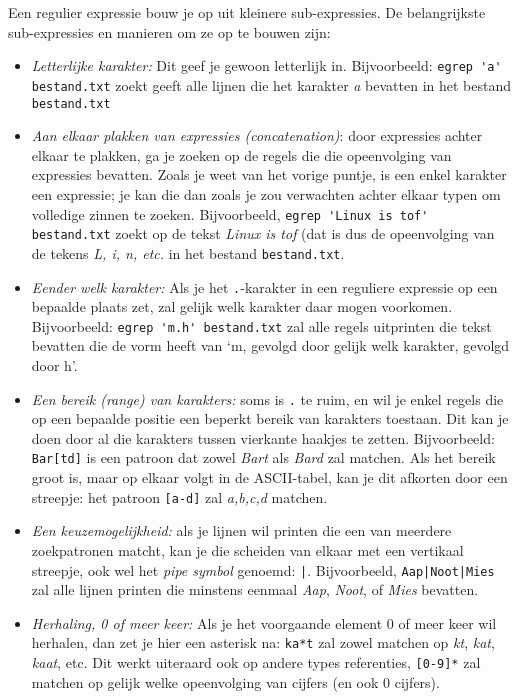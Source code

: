 \documentclass[a4paper,twoside,openany]{memoir}
\begin{document}
Een regulier expressie bouw je op uit kleinere sub-expressies. De belangrijkste sub-expressies en manieren om ze op te bouwen zijn:

\begin{itemize}
\item \emph{Letterlijke karakter:} Dit geef je gewoon letterlijk in.  Bijvoorbeeld: \verb!egrep 'a' bestand.txt! zoekt geeft alle lijnen die het karakter \emph{a} bevatten in het bestand \verb!bestand.txt!
\item \emph{Aan elkaar plakken van expressies (concatenation)}: door expressies achter elkaar te plakken, ga je zoeken op de regels die die opeenvolging van expressies bevatten. Zoals je weet van het vorige puntje, is een enkel karakter een expressie; je kan die dan zoals je zou verwachten achter elkaar typen om volledige zinnen te zoeken. Bijvoorbeeld, \verb!egrep 'Linux is tof' bestand.txt! zoekt op de tekst \emph{Linux is tof} (dat is dus de opeenvolging van de tekens \emph{L, i, n, etc.} in het bestand \verb!bestand.txt!.
\item \emph{Eender welk karakter:} Als je het \verb!.!-karakter in een reguliere expressie op een bepaalde plaats zet, zal gelijk welk karakter daar mogen voorkomen. Bijvoorbeeld: \verb!egrep 'm.h' bestand.txt! zal alle regels uitprinten die tekst bevatten die de vorm heeft van `m, gevolgd door gelijk welk karakter, gevolgd door h'.
\item \emph{Een bereik (range) van karakters:} soms is \verb!.! te ruim, en wil je enkel regels die op een bepaalde positie een beperkt bereik van karakters toestaan. Dit kan je doen door al die karakters tussen vierkante haakjes te zetten. Bijvoorbeeld: \verb!Bar[td]! is een patroon dat zowel \emph{Bart} als \emph{Bard} zal matchen. Als het bereik groot is, maar op elkaar volgt in de ASCII-tabel, kan je dit afkorten door een streepje: het patroon \verb![a-d]! zal \emph{a,b,c,d} matchen.
\item \emph{Een keuzemogelijkheid:} als je lijnen wil printen die een van meerdere zoekpatronen matcht, kan je die scheiden van elkaar met een vertikaal streepje, ook wel het \emph{pipe symbol} genoemd: \verb!|!. Bijvoorbeeld, \verb!Aap|Noot|Mies! zal alle lijnen printen die minstens eenmaal \emph{Aap}, \emph{Noot}, of \emph{Mies} bevatten.
\item \emph{Herhaling, 0 of meer keer:} Als je het voorgaande element 0 of meer keer wil herhalen, dan zet je hier een asterisk na: \verb!ka*t! zal zowel matchen op \emph{kt}, \emph{kat}, \emph{kaat}, etc. Dit werkt uiteraard ook op andere types referenties, \verb![0-9]*! zal matchen op gelijk welke opeenvolging van cijfers (en ook 0 cijfers).

\end{itemize}
\end{document}
